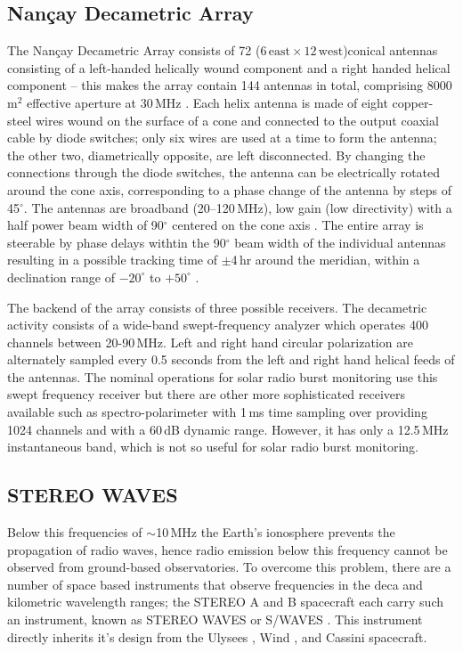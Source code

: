 \subsection{Nan\c{c}ay Decametric Array}\label{sec:32}

The Nan\c{c}ay Decametric Array consists of 72 ($6\,\mathrm{east} \times12\,\mathrm{west}$)conical antennas consisting of a left-handed helically wound component and a right handed helical component -- this makes the array contain 144 antennas in total, comprising 8000\,m$^2$ effective aperture at 30\,MHz \citep{lecacheux2000}. Each helix antenna is made of eight copper-steel wires wound on the surface of a cone and connected to the output coaxial cable by diode switches; only six wires are used at a time to form the antenna; the other two, diametrically opposite, are left disconnected. By changing the connections through the diode switches, the antenna can be electrically rotated around the cone axis, corresponding to a phase change of the antenna by steps of 45$^{\circ}$. The antennas are broadband (20--120\,MHz), low gain (low directivity) with a half power beam width of 90$^{\circ}$ centered on the cone axis \citep{boischot1980}. The entire array is steerable by phase delays withtin the 90$^{\circ}$  beam width of the individual antennas resulting in a possible tracking time of $\pm$4\,hr around the meridian, within a declination range of $-20^{\circ}$ to $+50^{\circ}$ .

The backend of the array consists of three possible receivers. The decametric activity consists of a wide-band swept-frequency analyzer which operates 400 channels between 20-90\,MHz. Left and right hand circular polarization are alternately sampled every 0.5 seconds from the left and right hand helical feeds of the antennas. The nominal operations for solar radio burst monitoring use this swept frequency receiver but there are other more sophisticated receivers available such as spectro-polarimeter with 1\,ms time sampling over providing 1024 channels and with a 60\,dB dynamic range. However, it has only a 12.5\,MHz instantaneous band, which is not so useful for solar radio burst monitoring.

\subsection{STEREO WAVES}\label{sec:31}

Below this frequencies of $\sim$10\,MHz the Earth's ionosphere prevents the propagation of radio waves, hence radio emission below this frequency cannot be observed from ground-based observatories. To overcome this problem, there are a number of space based instruments that observe frequencies in the deca and kilometric wavelength ranges; the STEREO A and B spacecraft each carry such an instrument, known as STEREO WAVES or S/WAVES \citep{bougeret2008}. This instrument directly inherits it's design from the Ulysees \citep{stone1992}, Wind \citep{bougeret1995}, and Cassini \citep{gurnett2004} spacecraft.

